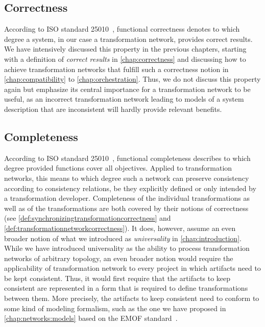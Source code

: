 \subsection{Correctness}

According to ISO standard 25010~\cite{iso25010}, functional correctness denotes to which degree a system, in our case a transformation network, provides correct results.
We have intensively discussed this property in the previous chapters, starting with a definition of \emph{correct results} in \autoref{chap:correctness} and discussing how to achieve transformation networks that fulfill such a correctness notion in \autoref{chap:compatibility} to \autoref{chap:orchestration}.
Thus, we do not discuss this property again but emphasize its central importance for a transformation network to be useful, as an incorrect transformation network leading to models of a system description that are inconsistent will hardly provide relevant benefits.


\subsection{Completeness}

According to ISO standard 25010~\cite{iso25010}, functional completeness describes to which degree provided functions cover all objectives.
Applied to transformation networks, this means to which degree such a network can preserve consistency according to consistency relations, be they explicitly defined or only intended by a transformation developer.
Completeness of the individual transformations as well as of the transformations are both covered by their notions of correctness (see \autoref{def:synchronizingtransformationcorrectness} and \autoref{def:transformationnetworkcorrectness}).
It does, however, assume an even broader notion of what we introduced as \emph{universality} in \autoref{chap:introduction}.
While we have introduced universality as the ability to process transformation networks of arbitrary topology, an even broader notion would require the applicability of transformation network to every project in which artifacts need to be kept consistent.
Thus, it would first require that the artifacts to keep consistent are represented in a form that is required to define transformations between them.
More precisely, the artifacts to keep consistent need to conform to some kind of modeling formalism, such as the one we have proposed in \autoref{chap:networks:models} based on the \gls{EMOF} standard~\cite{mof}.

